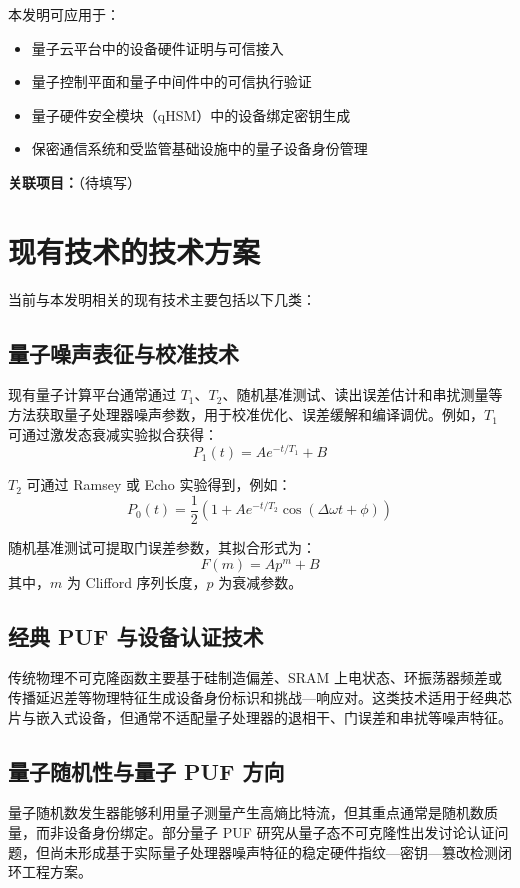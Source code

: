 \documentclass[12pt,a4paper]{article}
\begin{document}
本发明可应用于：
\begin{itemize}
    \item 量子云平台中的设备硬件证明与可信接入
    \item 量子控制平面和量子中间件中的可信执行验证
    \item 量子硬件安全模块（qHSM）中的设备绑定密钥生成
    \item 保密通信系统和受监管基础设施中的量子设备身份管理
\end{itemize}

\textbf{关联项目：}\underline{\hspace{8cm}}（待填写）

\section{现有技术的技术方案}

当前与本发明相关的现有技术主要包括以下几类：

\subsection{量子噪声表征与校准技术}

现有量子计算平台通常通过 $T_1$、$T_2$、随机基准测试、读出误差估计和串扰测量等方法获取量子处理器噪声参数，用于校准优化、误差缓解和编译调优。例如，$T_1$ 可通过激发态衰减实验拟合获得：
\[
P_1(t) = A e^{-t/T_1} + B
\]

$T_2$ 可通过 Ramsey 或 Echo 实验得到，例如：
\[
P_0(t) = \frac{1}{2}\left(1 + A e^{-t/T_2}\cos(\Delta \omega t + \phi)\right)
\]

随机基准测试可提取门误差参数，其拟合形式为：
\[
F(m) = A p^m + B
\]
其中，$m$ 为 Clifford 序列长度，$p$ 为衰减参数。

\subsection{经典 PUF 与设备认证技术}

传统物理不可克隆函数主要基于硅制造偏差、SRAM 上电状态、环振荡器频差或传播延迟差等物理特征生成设备身份标识和挑战—响应对。这类技术适用于经典芯片与嵌入式设备，但通常不适配量子处理器的退相干、门误差和串扰等噪声特征。

\subsection{量子随机性与量子 PUF 方向}

量子随机数发生器能够利用量子测量产生高熵比特流，但其重点通常是随机数质量，而非设备身份绑定。部分量子 PUF 研究从量子态不可克隆性出发讨论认证问题，但尚未形成基于实际量子处理器噪声特征的稳定硬件指纹—密钥—篡改检测闭环工程方案。
\end{document}
